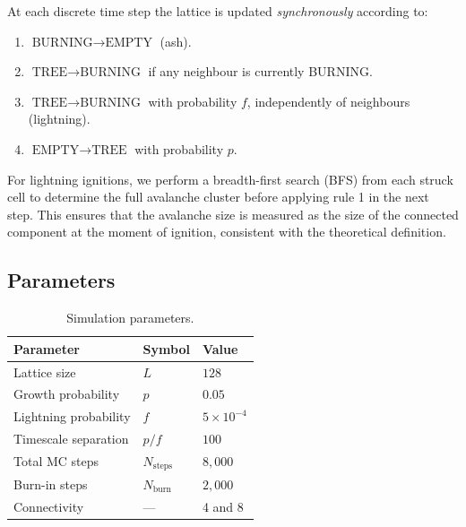 \documentclass[12pt,a4paper]{article}
\begin{document}
At each discrete time step the lattice is updated \emph{synchronously}
according to:
\begin{enumerate}
  \item $\text{BURNING} \rightarrow \text{EMPTY}$ (ash).
  \item $\text{TREE} \rightarrow \text{BURNING}$ if any neighbour is
        currently BURNING.
  \item $\text{TREE} \rightarrow \text{BURNING}$ with probability $f$,
        independently of neighbours (lightning).
  \item $\text{EMPTY} \rightarrow \text{TREE}$ with probability $p$.
\end{enumerate}

For lightning ignitions, we perform a breadth-first search (BFS) from each
struck cell to determine the full avalanche cluster before applying rule 1
in the next step.  This ensures that the avalanche size is measured as the
size of the connected component at the moment of ignition, consistent with
the theoretical definition.

\subsection{Parameters}

\begin{table}[H]
  \centering
  \caption{Simulation parameters.}
  \label{tab:params}
  \begin{tabular}{lll}
    \toprule
    Parameter            & Symbol            & Value                  \\
    \midrule
    Lattice size         & $L$               & $128$                  \\
    Growth probability   & $p$               & $0.05$                 \\
    Lightning probability & $f$              & $5\times10^{-4}$       \\
    Timescale separation & $p/f$             & $100$                  \\
    Total MC steps       & $N_\text{steps}$  & $8{,}000$              \\
    Burn-in steps        & $N_\text{burn}$   & $2{,}000$              \\
    Connectivity         & ---               & 4 and 8                \\
    \bottomrule
  \end{tabular}
\end{table}
\end{document}
